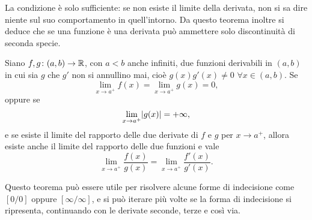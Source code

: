 La condizione è solo sufficiente: se non esiste il limite della derivata, non si sa dire niente sul suo comportamento in quell'intorno.
Da questo teorema inoltre si deduce che se una funzione è una derivata può ammettere solo discontinuità di seconda specie.
\begin{teorema}[de l'H\^opital]
\label{t:hopital}
Siano $f,g\colon(a,b)\to\mathbb{R}$, con $a<b$ anche infiniti, due funzioni derivabili in $(a,b)$ in cui sia $g$ che $g'$ non si annullino mai, cioè $g(x)g'(x)\neq 0$ $\forall x\in(a,b)$. Se
\[
\lim_{x\to a^+}f(x)=\lim_{x\to a^+}g(x)=0,
\]
oppure se
\[
\lim_{x\to a^+}\lvert g(x)\rvert=+\infty,
\]
e se esiste il limite del rapporto delle due derivate di $f$ e $g$ per $x\to a^+$, allora esiste anche il limite del rapporto delle due funzioni e vale
\begin{equation}
\label{eq:hopital}
\lim_{x\to a^+}\frac{f(x)}{g(x)}=\lim_{x\to a^+}\frac{f'(x)}{g'(x)}.
\end{equation}
\end{teorema}
Questo teorema può essere utile per risolvere alcune forme di indecisione come $[0/0]$ oppure $[\infty /\infty]$, e si può iterare più volte se la forma di indecisione si ripresenta, continuando con le derivate seconde, terze e così via.
